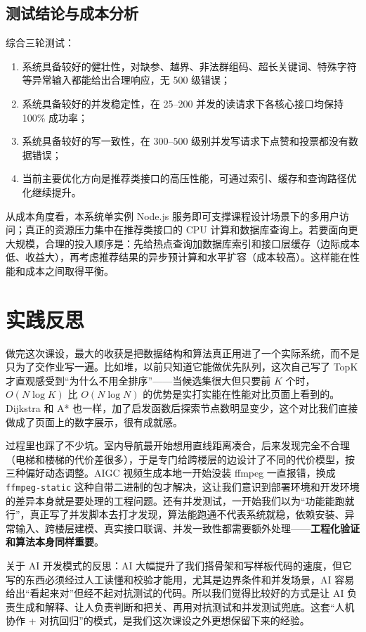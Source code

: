 \documentclass[UTF8,a4paper,12pt]{ctexart}
\begin{document}
\subsection{测试结论与成本分析}
综合三轮测试：
\begin{enumerate}
\item 系统具备较好的健壮性，对缺参、越界、非法群组码、超长关键词、特殊字符等异常输入都能给出合理响应，无 500 级错误；
\item 系统具备较好的并发稳定性，在 25--200 并发的读请求下各核心接口均保持 100\% 成功率；
\item 系统具备较好的写一致性，在 300--500 级别并发写请求下点赞和投票都没有数据错误；
\item 当前主要优化方向是推荐类接口的高压性能，可通过索引、缓存和查询路径优化继续提升。
\end{enumerate}

从成本角度看，本系统单实例 Node.js 服务即可支撑课程设计场景下的多用户访问；真正的资源压力集中在推荐类接口的 CPU 计算和数据库查询上。若要面向更大规模，合理的投入顺序是：先给热点查询加数据库索引和接口层缓存（边际成本低、收益大），再考虑推荐结果的异步预计算和水平扩容（成本较高）。这样能在性能和成本之间取得平衡。

\section{实践反思}

做完这次课设，最大的收获是把数据结构和算法真正用进了一个实际系统，而不是只为了交作业写一遍。比如堆，以前只知道它能做优先队列，这次自己写了 TopK 才直观感受到“为什么不用全排序”——当候选集很大但只要前 $K$ 个时，$O(N\log K)$ 比 $O(N\log N)$ 的优势是实打实能在性能对比页面上看到的。Dijkstra 和 A* 也一样，加了启发函数后探索节点数明显变少，这个对比我们直接做成了页面上的数字展示，很有成就感。

过程里也踩了不少坑。室内导航最开始想用直线距离凑合，后来发现完全不合理（电梯和楼梯的代价差很多），于是专门给跨楼层的边设计了不同的代价模型，按三种偏好动态调整。AIGC 视频生成本地一开始没装 ffmpeg 一直报错，换成 \texttt{ffmpeg-static} 这种自带二进制的包才解决，这让我们意识到部署环境和开发环境的差异本身就是要处理的工程问题。还有并发测试，一开始我们以为“功能能跑就行”，真正写了并发脚本去打才发现，算法能跑通不代表系统就稳，依赖安装、异常输入、跨楼层建模、真实接口联调、并发一致性都需要额外处理——\textbf{工程化验证和算法本身同样重要}。

关于 AI 开发模式的反思：AI 大幅提升了我们搭骨架和写样板代码的速度，但它写的东西必须经过人工读懂和校验才能用，尤其是边界条件和并发场景，AI 容易给出“看起来对”但经不起对抗测试的代码。所以我们觉得比较好的方式是让 AI 负责生成和解释、让人负责判断和把关、再用对抗测试和并发测试兜底。这套“人机协作 + 对抗回归”的模式，是我们这次课设之外更想保留下来的经验。
\end{document}
